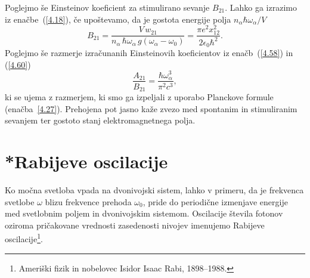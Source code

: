 Poglejmo še Einsteinov koeficient za stimulirano sevanje $B_{21}$. Lahko ga 
izrazimo iz enačbe~(\ref{4.18}), če upoštevamo, da je gostota energije 
polja $n_{\alpha}\hbar\omega_{\alpha}/V$
\begin{equation}
B_{21}=\frac{V\,w_{21}}{n_{\alpha}\,\hbar\omega_{\alpha}\, g(\omega_{\alpha}-\omega_0)}
=\frac{\pi e^{2}x_{12}^{2}}{2\epsilon_{0}\hbar^{2}}.
\label{4.60}
\end{equation}
Poglejmo  še razmerje izračunanih Einsteinovih koeficientov iz enačb~(\ref{4.58}) in 
(\ref{4.60})
\begin{equation}
 \frac{A_{21}}{B_{21}}=\frac{\hbar \omega_\alpha^3}{\pi^2 c^3},
\end{equation}
ki se ujema z razmerjem, ki smo ga izpeljali z uporabo
Planckove formule (enačba~\ref{4.27}). Prehojena pot jasno kaže zvezo med spontanim in
stimuliranim sevanjem ter gostoto stanj elektromagnetnega polja. 

\section{*Rabijeve oscilacije}
Ko močna svetloba vpada na dvonivojski sistem, lahko v primeru, da je frekvenca 
svetlobe $\omega$ blizu frekvence prehoda $\omega_0$, pride do periodične 
izmenjave energije med 
svetlobnim poljem in dvonivojskim sistemom. 
Oscilacije števila fotonov oziroma pričakovane 
vrednosti zasedenosti nivojev imenujemo Rabijeve 
oscilacije\footnote{Ameriški fizik in nobelovec Isidor Isaac Rabi, 1898--1988.}. 


